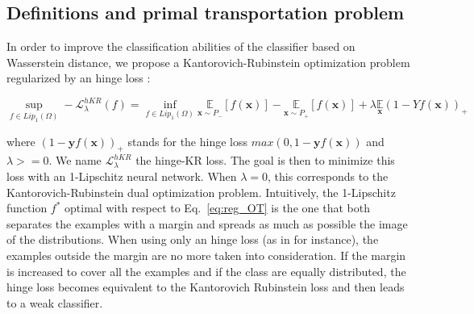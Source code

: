 \subsection{Definitions and primal transportation problem}
In order to improve the classification abilities of the classifier based on Wasserstein distance, we propose a Kantorovich-Rubinstein optimization problem regularized by an hinge loss :


\begin{equation} \label{eq:reg_OT} 
\sup_{f \in Lip_1(\Omega)} -\mathcal{L}^{hKR}_\lambda(f) = \inf_{f \in Lip_1(\Omega)} \underset{\textbf{x} \sim P_-}{\mathbb{E}} \left[f(\textbf{x})\right]-\underset{\textbf{x} \sim P_+}{\mathbb{E}}\left[f(\textbf{x})\right] +\lambda\underset{\textbf{x}}{\mathbb{E}} \left(1-Yf(\textbf{x})\right)_+ 
\end{equation}

where $(1-\textbf{y}f(\textbf{x}))_+$ stands for the hinge loss $max(0,1-\textbf{y}f(\textbf{x}))$ and $\lambda>=0$. We name $\mathcal{L}^{hKR}_\lambda$ the hinge-KR loss. The goal is then to minimize this loss with an 1-Lipschitz neural network.
When $\lambda=0$, this corresponds to the Kantorovich-Rubinstein dual optimization problem. Intuitively, the 1-Lipschitz function $f^*$ optimal with respect to Eq.~\eqref{eq:reg_OT} is the one that both separates the examples with a margin and spreads as much as possible the image of the distributions. When using only an hinge loss (as in \cite{li2019preventing} for instance), the examples outside the margin are no more taken into consideration. If the margin is increased to cover all the examples and if the class are equally distributed, the hinge loss becomes equivalent to the Kantorovich Rubinstein loss and then leads to a weak classifier. 

